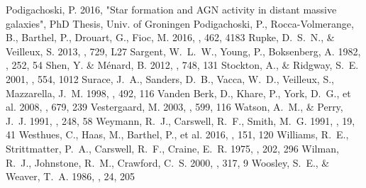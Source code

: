 \documentclass[preprint]{aastex}
\begin{document}
\begin{thebibliography}{}
  Podigachoski, P. 2016, "Star formation and AGN activity in
  distant massive galaxies", PhD Thesis, Univ. of Groningen 
  Podigachoski, P., Rocca-Volmerange, B., Barthel, P., Drouart, G., Fioc, M.
  2016, \mnras, 462, 4183 
  Rupke, D.~S.~N., \& Veilleux, S. 2013, \apj, 729, L27
  Sargent, W.~L.~W., Young, P., Boksenberg, A. 1982, \apj, 252, 54 
  Shen, Y. \& M\'enard, B. 2012, \apj, 748, 131
  Stockton, A., \& Ridgway, S.~E. 2001, \apj, 554, 1012
  Surace, J.~A., Sanders, D.~B., Vacca, W.~D., Veilleux, S., Mazzarella, J.~M.
  1998, \apj, 492, 116
  Vanden Berk, D., Khare, P., York, D.~G., et al. 2008, \apj, 679, 239
  Vestergaard, M. 2003, \apj, 599, 116
  Watson, A.~M., \& Perry, J.~J. 1991, \mnras, 248, 58   
  Weymann, R.~J., Carswell, R.~F., Smith, M.~G. 1991, \araa, 19, 41
  Westhues, C., Haas, M., Barthel, P., et al. 2016, \aj, 151, 120
  Williams, R.~E., Strittmatter, P.~A., Carswell, R.~F., Craine, E.~R.
  1975, \apj, 202, 296
  Wilman, R.~J., Johnstone, R.~M., Crawford, C.~S. 2000, \mnras, 317, 9 
  Woosley, S.~E., \& Weaver, T.~A. 1986, \araa, 24, 205
\end{thebibliography}
\end{document}
